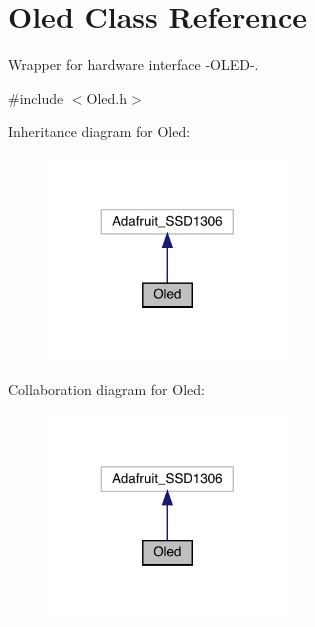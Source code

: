 \hypertarget{class_oled}{}\section{Oled Class Reference}
\label{class_oled}


Wrapper for hardware interface -\/\+O\+L\+E\+D-\/.  




{\ttfamily \#include $<$Oled.\+h$>$}



Inheritance diagram for Oled\+:\nopagebreak
\begin{figure}[H]
\begin{center}
\leavevmode
\includegraphics[width=179pt]{class_oled__inherit__graph}
\end{center}
\end{figure}


Collaboration diagram for Oled\+:\nopagebreak
\begin{figure}[H]
\begin{center}
\leavevmode
\includegraphics[width=179pt]{class_oled__coll__graph}
\end{center}
\end{figure}
